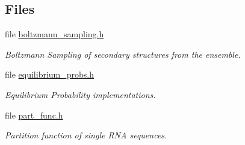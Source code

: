 \subsection*{Files}
\begin{DoxyCompactItemize}
\item 
file \hyperlink{boltzmann__sampling_8h}{boltzmann\+\_\+sampling.\+h}
\begin{DoxyCompactList}\small\item\em Boltzmann Sampling of secondary structures from the ensemble. \end{DoxyCompactList}\item 
file \hyperlink{equilibrium__probs_8h}{equilibrium\+\_\+probs.\+h}
\begin{DoxyCompactList}\small\item\em Equilibrium Probability implementations. \end{DoxyCompactList}\item 
file \hyperlink{part__func_8h}{part\+\_\+func.\+h}
\begin{DoxyCompactList}\small\item\em Partition function of single R\+NA sequences. \end{DoxyCompactList}\end{DoxyCompactItemize}
